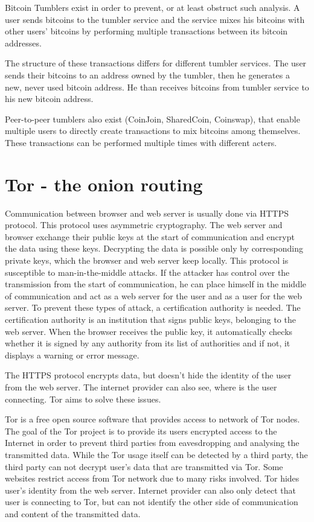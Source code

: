 \documentclass[
  digital, %
  table,   %
  lof,     %
  lot,     %
  oneside
]{fithesis3}
\begin{document}
Bitcoin Tumblers exist in order to prevent, or at least obstruct such analysis.
A user sends bitcoins to the tumbler service and the service mixes his bitcoins
with other users' bitcoins by performing multiple transactions
between its bitcoin addresses. \cite{moser2013inquiry}
  
The structure of these transactions differs for different tumbler services.
The user sends their bitcoins to an address owned by the tumbler,
then he generates a new, never used bitcoin address.
He than receives bitcoins from tumbler service to his new bitcoin address.

Peer-to-peer tumblers also exist (CoinJoin, SharedCoin, Coinswap),
that enable multiple users to directly create transactions to mix bitcoins among themselves.
These transactions can be performed multiple times with different acters.

\section{Tor - the onion routing}

Communication between browser and web server is usually done via HTTPS protocol.
This protocol uses asymmetric cryptography. The web server and browser exchange their public keys at the start of communication
and encrypt the data using these keys. Decrypting the data is possible only by corresponding private keys,
which the browser and web server keep locally. This protocol is susceptible to man-in-the-middle attacks.
If the attacker has control over the transmission from the start of communication, he can place himself in the middle of communication and act as a web server for the user and as a user for the web server. To prevent these types of attack,
 a certification authority is needed. The certification authority is an institution that signs public keys, belonging to the web server.
 When the browser receives the public key, it automatically checks whether it is signed by any authority from its list of authorities and if not,
 it displays a warning or error message.
 
The HTTPS protocol encrypts data, but doesn't hide the identity of the user from the web server.
The internet provider can also see, where is the user connecting. Tor aims to solve these issues.
 
Tor \cite{dingledine2004tor} is a free open source software that provides access to network of Tor nodes. 
The goal of the Tor project is to provide its users encrypted access to the Internet in order to prevent third parties
from eavesdropping and analysing the transmitted data.
While the Tor usage itself can be detected by a third party, the third party can not decrypt user's data that are transmitted
 via Tor. Some websites restrict access from Tor network due to many risks involved.
Tor hides user's identity from the web server. Internet provider can also only detect that user is connecting to Tor,
but can not identify the other side of communication and content of the transmitted data.
\end{document}
